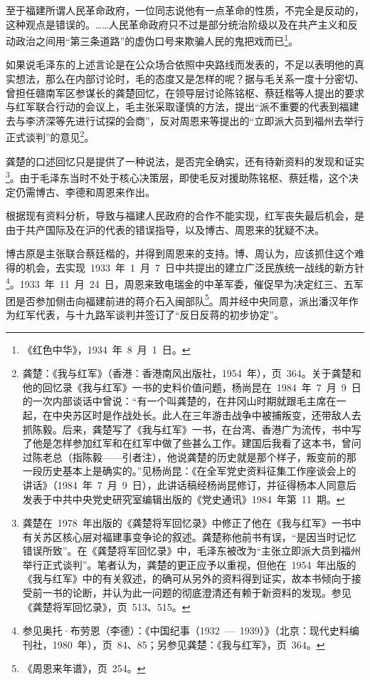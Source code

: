 \begin{quoting}
至于福建所谓人民革命政府，一位同志说他有一点革命的性质，不完全是反动的，这种观点是错误的。……人民革命政府只不过是部分统治阶级以及在共产主义和反动政治之间用“第三条道路”的虚伪口号来欺骗人民的鬼把戏而已\footnote{《红色中华》，1934~年~8~月~1~日。}。
\end{quoting}

如果说毛泽东的上述言论是在公众场合依照中央路线而发表的，不足以表明他的真实想法，那么在内部讨论时，毛的态度又是怎样的呢？据与毛关系一度十分密切、曾担任赣南军区参谋长的龚楚回忆，在领导层讨论陈铭枢、蔡廷楷等人提出的要求与红军联合行动的会议上，毛主张采取谨慎的方法，提出“派不重要的代表到福建去与李济深等先进行试探的会商”，反对周恩来等提出的“立即派大员到福州去举行正式谈判”的意见\footnote{龚楚：《我与红军》（香港：香港南风出版社，1954~年），页~364。关于龚楚和他的回忆录《我与红军》一书的史料价值问题，杨尚昆在~1984~年~7~月~9~日的一次内部谈话中曾说：“有一个叫龚楚的，在井冈山时期就跟毛主席在一起，在中央苏区时是作战处长。此人在三年游击战争中被捕叛变，还带敌人去抓陈毅。后来，龚楚写了《我与红军》一书，在台湾、香港广为流传，书中写了他是怎样参加红军和在红军中做了些甚么工作。建国后我看了这本书，曾问过陈老总（指陈毅——引者注），他说龚楚的历史就是那个样子，叛变前的那一段历史基本上是确实的。”见杨尚昆：《在全军党史资料征集工作座谈会上的讲话》（1984~年~7~月~9~日），此讲话稿经杨尚昆修订，并征得杨本人同意后发表于中共中央党史研究室编辑出版的《党史通讯》1984~年第~11~期。}。

龚楚的口述回忆只是提供了一种说法，是否完全确实，还有待新资料的发现和证实\footnote{龚楚在~1978~年出版的《龚楚将军回忆录》中修正了他在《我与红军》一书中有关苏区核心层对福建事变争论的叙述。龚楚称他前书有误，“是因当时记忆错误所致”。在《龚楚将军回忆录》中，毛泽东被改为“主张立即派大员到福州举行正式谈判”。笔者认为，龚楚的更正应予以重视，但他在~1954~年出版的《我与红军》中的有关叙述，的确可从另外的资料得到证实，故本书倾向于接受前一书的论断，并认为此一问题的彻底澄清还有赖于新资料的发现。参见《龚楚将军回忆录》，页~513、515。}。由于毛泽东当时不处于核心决策层，即使毛反对援助陈铭枢、蔡廷楷，这个决定仍需博古、李德和周恩来作出。

根据现有资料分析，导致与福建人民政府的合作不能实现，红军丧失最后机会，是由于共产国际及在沪的代表的错误指导，以及博古、周恩来的犹疑不决。

博古原是主张联合蔡廷楷的，并得到周恩来的支持。博、周认为，应该抓住这个难得的机会，去实现~1933~年~1~月~7~日中共提出的建立广泛民族统一战线的新方针\footnote{参见奥托·布劳恩（李德）：《中国纪事（1932~—~1939）》（北京：现代史料编刊社，1980~年），页~84、85；另参见龚楚：《我与红军》，页~364。}。1933~年~11~月~24~日，周恩来致电瑞金的中革军委，催促早为决定红三、五军团是否参加侧击向福建前进的蒋介石入闽部队\footnote{《周恩来年谱》，页~254。}。周并经中央同意，派出潘汉年作为红军代表，与十九路军谈判并签订了“反日反蒋的初步协定”。

